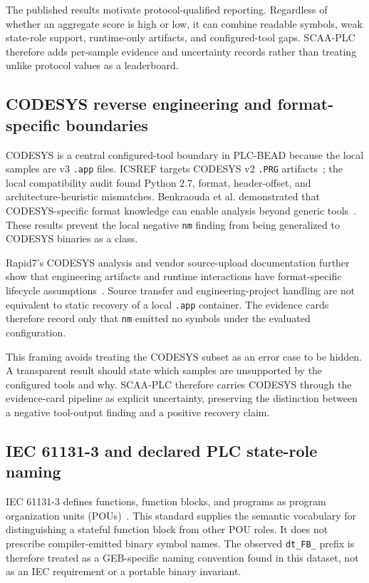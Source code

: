 \documentclass[a4paper,fleqn]{cas-dc}
\begin{document}
The published results motivate protocol-qualified reporting. Regardless of whether an aggregate score is high or low, it can combine readable symbols, weak state-role support, runtime-only artifacts, and configured-tool gaps. SCAA-PLC therefore adds per-sample evidence and uncertainty records rather than treating unlike protocol values as a leaderboard.

\subsection{CODESYS reverse engineering and format-specific boundaries}

CODESYS is a central configured-tool boundary in PLC-BEAD because the local samples are v3 \texttt{.app} files. ICSREF targets CODESYS v2 \texttt{.PRG} artifacts~\citep{icsref_ndss2019}; the local compatibility audit found Python 2.7, format, header-offset, and architecture-heuristic mismatches. Benkraouda et al. demonstrated that CODESYS-specific format knowledge can enable analysis beyond generic tools~\citep{benkraouda_codesys2023}. These results prevent the local negative \texttt{nm} finding from being generalized to CODESYS binaries as a class.

Rapid7's CODESYS analysis and vendor source-upload documentation further show that engineering artifacts and runtime interactions have format-specific lifecycle assumptions~\citep{rapid7_codesys_whitepaper2023,codesys_source_upload_docs}. Source transfer and engineering-project handling are not equivalent to static recovery of a local \texttt{.app} container. The evidence cards therefore record only that \texttt{nm} emitted no symbols under the evaluated configuration.

This framing avoids treating the CODESYS subset as an error case to be hidden. A transparent result should state which samples are unsupported by the configured tools and why. SCAA-PLC therefore carries CODESYS through the evidence-card pipeline as explicit uncertainty, preserving the distinction between a negative tool-output finding and a positive recovery claim.

\subsection{IEC 61131-3 and declared PLC state-role naming}

IEC 61131-3 defines functions, function blocks, and programs as program organization units (POUs)~\citep{iec61131_3}. This standard supplies the semantic vocabulary for distinguishing a stateful function block from other POU roles. It does not prescribe compiler-emitted binary symbol names. The observed \texttt{dt\_FB\_} prefix is therefore treated as a GEB-specific naming convention found in this dataset, not as an IEC requirement or a portable binary invariant.
\end{document}
